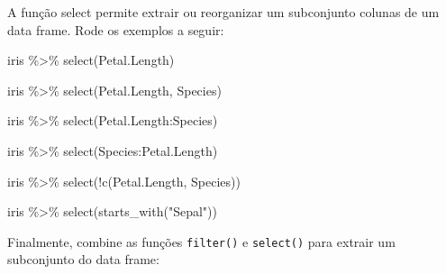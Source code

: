 \documentclass[
]{book}
\newenvironment{Shaded}{\begin{snugshade}}{\end{snugshade}}
\newcommand{\FunctionTok}[1]{\textcolor[rgb]{0.00,0.00,0.00}{#1}}
\newcommand{\NormalTok}[1]{#1}
\newcommand{\SpecialCharTok}[1]{\textcolor[rgb]{0.00,0.00,0.00}{#1}}
\newcommand{\StringTok}[1]{\textcolor[rgb]{0.31,0.60,0.02}{#1}}
\begin{document}
A função select permite extrair ou reorganizar um subconjunto colunas de um data frame. Rode os exemplos a seguir:

\begin{Shaded}
\begin{Highlighting}[]
\NormalTok{iris }\SpecialCharTok{\%\textgreater{}\%} 
  \FunctionTok{select}\NormalTok{(Petal.Length)}
\end{Highlighting}
\end{Shaded}

\begin{Shaded}
\begin{Highlighting}[]
\NormalTok{iris }\SpecialCharTok{\%\textgreater{}\%} 
  \FunctionTok{select}\NormalTok{(Petal.Length, Species)}
\end{Highlighting}
\end{Shaded}

\begin{Shaded}
\begin{Highlighting}[]
\NormalTok{iris }\SpecialCharTok{\%\textgreater{}\%} 
  \FunctionTok{select}\NormalTok{(Petal.Length}\SpecialCharTok{:}\NormalTok{Species)}
\end{Highlighting}
\end{Shaded}

\begin{Shaded}
\begin{Highlighting}[]
\NormalTok{iris }\SpecialCharTok{\%\textgreater{}\%} 
  \FunctionTok{select}\NormalTok{(Species}\SpecialCharTok{:}\NormalTok{Petal.Length)}
\end{Highlighting}
\end{Shaded}

\begin{Shaded}
\begin{Highlighting}[]
\NormalTok{iris }\SpecialCharTok{\%\textgreater{}\%} 
  \FunctionTok{select}\NormalTok{(}\SpecialCharTok{!}\FunctionTok{c}\NormalTok{(Petal.Length, Species))}
\end{Highlighting}
\end{Shaded}

\begin{Shaded}
\begin{Highlighting}[]
\NormalTok{iris }\SpecialCharTok{\%\textgreater{}\%} 
  \FunctionTok{select}\NormalTok{(}\FunctionTok{starts\_with}\NormalTok{(}\StringTok{"Sepal"}\NormalTok{))}
\end{Highlighting}
\end{Shaded}

Finalmente, combine as funções \texttt{filter()} e \texttt{select()} para extrair um subconjunto do data frame:
\end{document}
